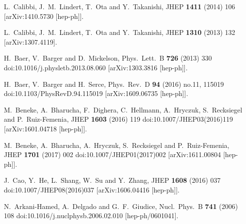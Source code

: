 \documentclass[12pt,twoside]{article}
\begin{document}
\begin{thebibliography}{99}
  L.~Calibbi, J.~M.~Lindert, T.~Ota and Y.~Takanishi,
  JHEP {\bf 1411} (2014) 106
  [arXiv:1410.5730 [hep-ph]].
  
  L.~Calibbi, J.~M.~Lindert, T.~Ota and Y.~Takanishi,
  JHEP {\bf 1310} (2013) 132
  [arXiv:1307.4119].

  H.~Baer, V.~Barger and D.~Mickelson,
  Phys.\ Lett.\ B {\bf 726} (2013) 330
  doi:10.1016/j.physletb.2013.08.060
  [arXiv:1303.3816 [hep-ph]].

  H.~Baer, V.~Barger and H.~Serce,
  Phys.\ Rev.\ D {\bf 94} (2016) no.11,  115019
  doi:10.1103/PhysRevD.94.115019
  [arXiv:1609.06735 [hep-ph]].

  M.~Beneke, A.~Bharucha, F.~Dighera, C.~Hellmann, A.~Hryczuk, S.~Recksiegel and P.~Ruiz-Femenia,
  JHEP {\bf 1603} (2016) 119
  doi:10.1007/JHEP03(2016)119
  [arXiv:1601.04718 [hep-ph]].
  
  M.~Beneke, A.~Bharucha, A.~Hryczuk, S.~Recksiegel and P.~Ruiz-Femenia,
  JHEP {\bf 1701} (2017) 002
  doi:10.1007/JHEP01(2017)002
  [arXiv:1611.00804 [hep-ph]].
  

 

  J.~Cao, Y.~He, L.~Shang, W.~Su and Y.~Zhang,
  JHEP {\bf 1608} (2016) 037
  doi:10.1007/JHEP08(2016)037
  [arXiv:1606.04416 [hep-ph]].
  

 
  N.~Arkani-Hamed, A.~Delgado and G.~F.~Giudice,
  Nucl.\ Phys.\ B {\bf 741} (2006) 108
  doi:10.1016/j.nuclphysb.2006.02.010
  [hep-ph/0601041].
  


\end{thebibliography}
\end{document}
